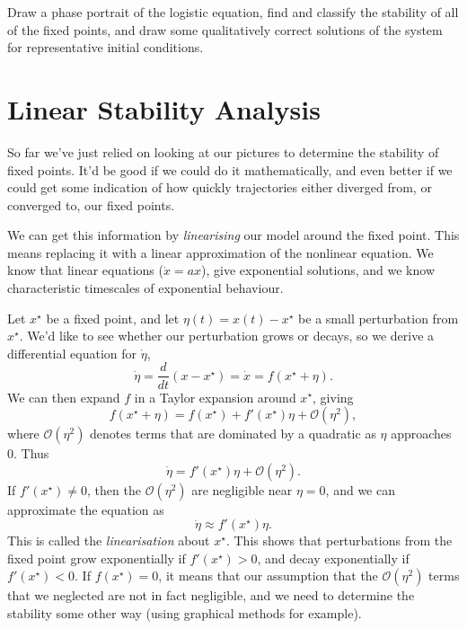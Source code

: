 \begin{example}
    Draw a phase portrait of the logistic equation, find and classify the
    stability of all of the fixed points, and draw some qualitatively
    correct solutions of the system for representative initial conditions.
\end{example}

\section{Linear Stability Analysis}
So far we've just relied on looking at our pictures to determine the
stability of fixed points. It'd be good if we could do it mathematically,
and even better if we could get some indication of how quickly trajectories
either diverged from, or converged to, our fixed points.

We can get this information by \emph{linearising} our model around the
fixed point. This means replacing it with a linear approximation of the
nonlinear equation. We know that linear equations ($\dot x = a x$), give
exponential solutions, and we know characteristic timescales of exponential
behaviour.

Let $x^\star$ be a fixed point, and let $\eta(t) = x(t) - x^\star$ be a
small perturbation from $x^\star$. We'd like to see whether our
perturbation grows or decays, so we derive a differential equation for
$\dot \eta$,
\begin{equation*}
    \dot \eta = \frac{d}{dt} (x - x^\star) = \dot x = f(x^\star + \eta).
\end{equation*}
We can then expand $f$ in a Taylor expansion around $x^\star$, giving
\begin{equation*}
    f(x^\star + \eta) = f(x^\star) + f'(x^\star) \eta +
    \mathcal{O}(\eta^2),
\end{equation*}
where $\mathcal{O}(\eta^2)$ denotes terms that are dominated by a quadratic
as $\eta$ approaches $0$. Thus
\begin{equation*}
    \dot \eta = f'(x^\star)\eta + \mathcal{O}(\eta^2).
\end{equation*}
If $f'(x^\star) \neq 0$, then the $\mathcal{O}(\eta^2)$ are negligible near
$\eta = 0$, and we can approximate the equation as
\begin{equation*}
    \dot \eta \approx f'(x^\star) \eta.
\end{equation*}
This is called the \emph{linearisation} about $x^\star$. This shows that
perturbations from the fixed point grow exponentially if $f'(x^\star) > 0$,
and decay exponentially if $f'(x^\star) < 0$. If $f(x^\star) = 0$, it means
that our assumption that the $\mathcal{O}(\eta^2)$ terms that we neglected
are not in fact negligible, and we need to determine the stability some
other way (using graphical methods for example).

